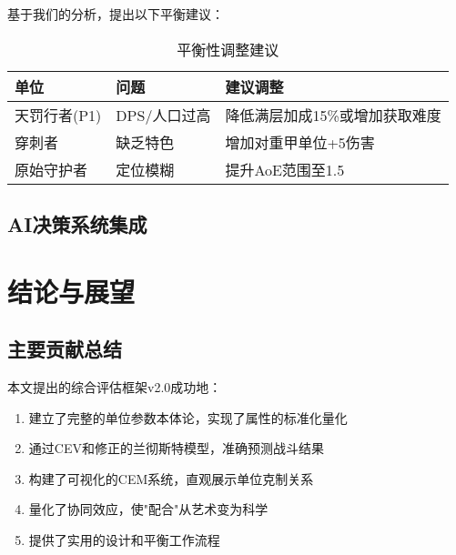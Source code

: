 \documentclass[a4paper,12pt]{article}
\begin{document}
\begin{CJK}{UTF8}{gbsn}
基于我们的分析，提出以下平衡建议：

\begin{table}[h]
\centering
\caption{平衡性调整建议}
\begin{tabular}{lll}
\toprule
\textbf{单位} & \textbf{问题} & \textbf{建议调整} \\
\midrule
天罚行者(P1) & DPS/人口过高 & 降低满层加成15\%或增加获取难度 \\
穿刺者 & 缺乏特色 & 增加对重甲单位+5伤害 \\
原始守护者 & 定位模糊 & 提升AoE范围至1.5 \\
\bottomrule
\end{tabular}
\end{table}

\subsection{AI决策系统集成}

\begin{center}
\end{center}

\section{结论与展望}

\subsection{主要贡献总结}
本文提出的综合评估框架v2.0成功地：
\begin{enumerate}
\item 建立了完整的单位参数本体论，实现了属性的标准化量化
\item 通过CEV和修正的兰彻斯特模型，准确预测战斗结果
\item 构建了可视化的CEM系统，直观展示单位克制关系
\item 量化了协同效应，使"配合"从艺术变为科学
\item 提供了实用的设计和平衡工作流程
\end{enumerate}


\end{CJK}
\end{document}
